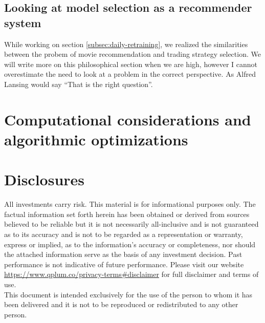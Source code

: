 \documentclass[a4paper]{article}
\begin{document}
\subsection{Looking at model selection as a recommender system}
\label{subsec:intuition-recommender}
While working on section \ref{subsec:daily-retraining}, we realized
the similarities between the probem of movie recommendation and
trading strategy selection. We will write more on this philosophical
section when we are high, however I cannot overestimate the need to
look at a problem in the correct perspective. As Alfred Lansing would
say ``That is the right question''.

\section{Computational considerations and algorithmic optimizations}
\label{need-for-speed}



\newpage
\section{Disclosures \label{disclosures} }
All investments carry risk. This material is for informational purposes only. The factual information set forth herein has been obtained or derived from sources believed to be reliable but it is not necessarily all-inclusive and is not guaranteed as to its accuracy and is not to be regarded as a representation or warranty, express or implied, as to the information’s accuracy or completeness, nor should the attached information serve as the basis of any investment decision. Past performance is not indicative of future performance. Please visit our website \url{https://www.qplum.co/privacy-terms#disclaimer} for full disclaimer and terms of use.\\
This document is intended exclusively for the use of the person to whom it has been delivered and it is not to be reproduced or redistributed to any other person.
\end{document}
